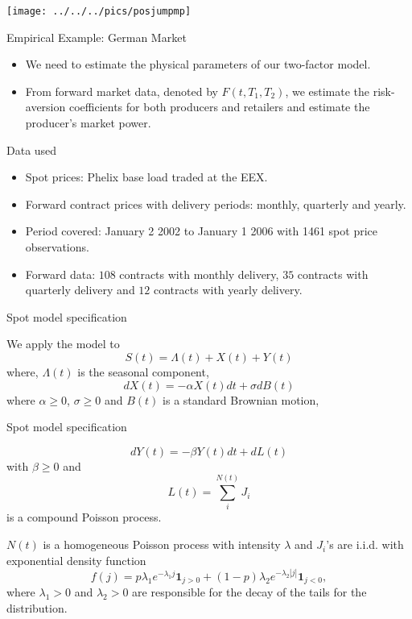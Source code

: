 \begin{center}
\texttt{[image: ../../../pics/posjumpmp]}
\end{center}

{Empirical Example: German Market}

\begin{itemize}
\item  We need to estimate the physical parameters
of our two-factor model.
\item From forward market data, denoted by
$F(t,T_1,T_2)$, we estimate the risk-aversion coefficients for both
producers and retailers and estimate the producer's market power.
\end{itemize}

{Data used}
\begin{itemize}
\item Spot prices: Phelix base load traded at the EEX.
\item Forward contract prices with delivery periods: monthly, quarterly and yearly.
\item Period covered: January 2 2002 to January 1 2006 with 1461 spot price
observations.
\item Forward data: $108$ contracts with
monthly delivery, $35$ contracts with quarterly delivery and $12$
contracts with yearly delivery.
\end{itemize}

{Spot model specification}

We apply the model to
\[S(t)=\Lambda(t)+X(t)+Y(t)\]
where, $\Lambda(t)$ is the seasonal component,
\begin{equation}
dX(t)=-\alpha X(t)dt+\sigma dB(t)
\end{equation}
where $\alpha\geq 0$,  $\sigma \geq 0$ and $B(t)$ is a
standard Brownian motion,

{Spot model specification}

\begin{equation}
dY(t)=-\beta Y(t)dt+dL(t)
\end{equation}
with $\beta \geq 0$ and
\begin{equation}
L(t)=\sum^{N(t)}_iJ_i
\end{equation}
is a compound Poisson process.

$N(t)$ is a homogeneous Poisson
process with intensity $\lambda$ and $J_i$'s are i.i.d. with
exponential density function
\[f(j)=p\lambda_1e^{-\lambda_1j}\textbf{1}_{j>0}+(1-p)\lambda_2e^{-\lambda_2|j|}\textbf{1}_{j<0},\]
where $\lambda_1>0$ and $\lambda_2>0$ are responsible for the
decay of the tails for the distribution.

